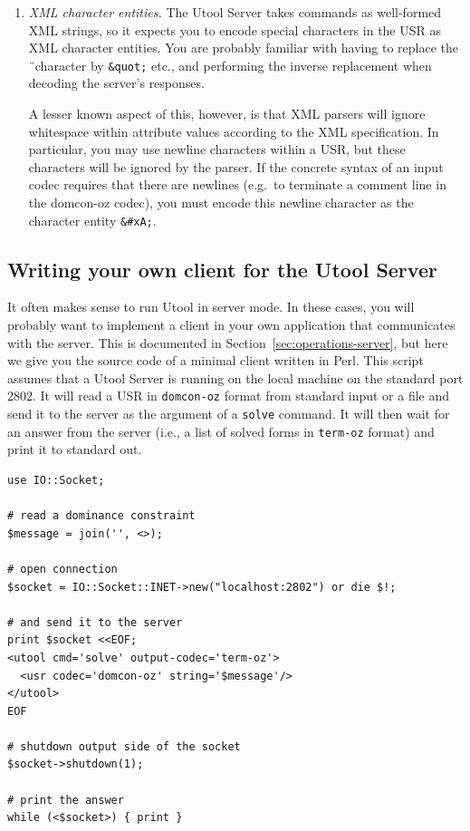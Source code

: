 \begin{enumerate}
\item \textit{XML character entities.} The Utool Server takes commands
as well-formed XML strings, so it expects you to encode special
characters in the USR as XML character entities. You are probably
familiar with having to replace the \"\ character by \verb?&quot;?
etc., and performing the inverse replacement when decoding the
server's responses.

A lesser known aspect of this, however, is that XML parsers will
ignore whitespace within attribute values according to the XML
specification. In particular, you may use newline characters within a
USR, but these characters will be ignored by the parser. If the
concrete syntax of an input codec requires that there are newlines
(e.g.\ to terminate a comment line in the domcon-oz codec), you must
encode this newline character as the character entity \verb?&#xA;?.
\end{enumerate}




\subsection{Writing your own client for the Utool Server}
\label{sec:practice-client}

It often makes sense to run Utool in server mode. In these cases, you
will probably want to implement a client in your own application that
communicates with the server. This is documented in
Section~\ref{sec:operations-server}, but here we give you the source
code of a minimal client written in Perl. This script assumes that a
Utool Server is running on the local machine on the standard port
2802. It will read a USR in \verb?domcon-oz? format from standard
input or a file and send it to the server as the argument of a
\verb?solve? command. It will then wait for an answer from the server
(i.e., a list of solved forms in \verb?term-oz? format) and print it
to standard out.

\begin{verbatim}
use IO::Socket;

# read a dominance constraint
$message = join('', <>);

# open connection
$socket = IO::Socket::INET->new("localhost:2802") or die $!;

# and send it to the server
print $socket <<EOF;
<utool cmd='solve' output-codec='term-oz'>
  <usr codec='domcon-oz' string='$message'/>
</utool>
EOF

# shutdown output side of the socket
$socket->shutdown(1);

# print the answer 
while (<$socket>) { print }
\end{verbatim}


